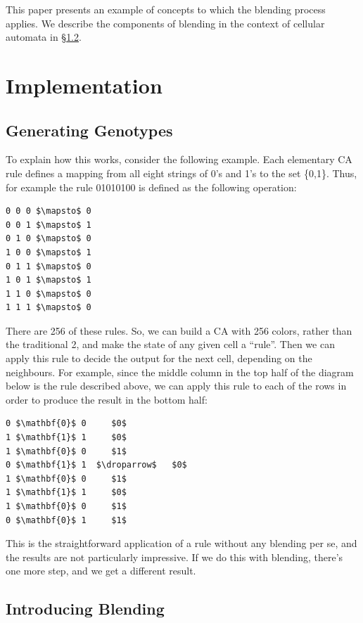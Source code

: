 \documentclass{AISB2008}
\newcommand{\droparrow}{%
  \mathchoice{\raisebox{-4pt}{$\displaystyle\mapsto$}}
             {\raisebox{-4pt}{$\mapsto$}}
             {\raisebox{-2pt}{$\scriptstyle\mapsto$}}
             {\raisebox{-2pt}{$\scriptscriptstyle\mapsto$}}}
\begin{document}
This paper presents an example of concepts to which the blending process applies. We describe the components of blending in the context of cellular automata in \S\ref{}.

\clearpage

\section{Implementation}


\subsection{Generating Genotypes}

To explain how this works, consider the following example.  Each elementary CA rule defines a mapping from all eight strings of 0's and 1's to the set \{0,1\}.  Thus, for example the rule 01010100 is defined as the following operation:
\begin{lstlisting}[mathescape]
0 0 0 $\mapsto$ 0
0 0 1 $\mapsto$ 1
0 1 0 $\mapsto$ 0
1 0 0 $\mapsto$ 1
0 1 1 $\mapsto$ 0
1 0 1 $\mapsto$ 1
1 1 0 $\mapsto$ 0
1 1 1 $\mapsto$ 0
\end{lstlisting}

There are 256 of these rules. So, we can build a CA with 256 colors, rather than the traditional 2, and make the state of any given cell a ``rule''. Then we can apply this rule to decide the output for the next cell, depending on the neighbours. For example, since the middle column in the top half of the diagram below is the rule described above, we can apply this rule to each of the rows in order to produce the result in the bottom half:
\begin{lstlisting}[mathescape]
0 $\mathbf{0}$ 0     $0$ 
1 $\mathbf{1}$ 1     $0$ 
1 $\mathbf{0}$ 0     $1$
0 $\mathbf{1}$ 1  $\droparrow$   $0$
1 $\mathbf{0}$ 0     $1$ 
1 $\mathbf{1}$ 1     $0$ 
1 $\mathbf{0}$ 0     $1$ 
0 $\mathbf{0}$ 1     $1$ 
\end{lstlisting}

This is the straightforward application of a rule without any blending per se, and the results are not particularly impressive.  If we do this with blending, there’s one more step, and we get a different result.

\subsection{Introducing Blending}
\end{document}
